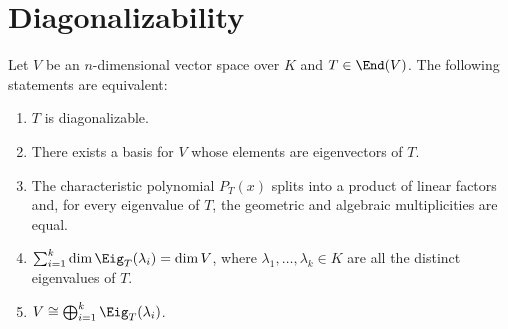 \renewcommand{\thetheorem}{21.c.\arabic{theorem}}
\setcounter{theorem}{0}
\section{Diagonalizability}

\begin{theorem}\label{thm:diag_equiv}
  Let $V$ be an $n$-dimensional vector space over $K$ and $T \in \End(V)$. The following statements are equivalent:
  \begin{enumerate}[label=\textbf{(\alph*)}]
    \item $T$ is diagonalizable.
    \item There exists a basis for $V$ whose elements are eigenvectors of $T$.
    \item The characteristic polynomial $P_T(x)$ splits into a product of linear factors and, for every eigenvalue of $T$, the geometric and algebraic multiplicities are equal.
    \item $\sum_{i=1}^k \dim \Eig_T(\lambda_i) = \dim V$, where $\lambda_1, \dots, \lambda_k \in K$ are all the distinct eigenvalues of $T$.
    \item $V \cong \bigoplus_{i=1}^k \Eig_T(\lambda_i)$.
  \end{enumerate}
\end{theorem}

